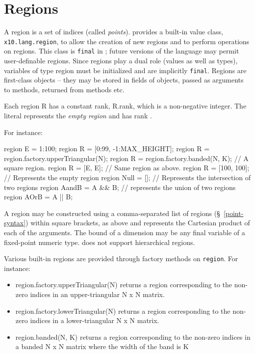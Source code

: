 \section{Regions}\label{XtenRegions}

A region is a set of indices (called {\em points}).  {}\Xten{}
provides a built-in value class, {\tt x10.lang.region}, to allow the
creation of new regions and to perform operations on regions. This
class is {\tt final} in {}\XtenCurrVer; future versions of the
language may permit user-definable regions. Since regions play a dual
role (values as well as types), variables of type {\cf region} must be
initialized and are implicitly {\tt final}. Regions are first-class
objects -- they may be stored in fields of objects, passed as
arguments to methods, returned from methods etc.

Each region {\cf R} has a constant rank, {\cf R.rank}, which is a
non-negative integer. The literal {\cf []} represents the {\em empty
region} and has rank {}.

For instance:
\begin{x10}
region E = 1:100;
region R = [0:99, -1:MAX\_HEIGHT];   
region R = region.factory.upperTriangular(N);
region R = region.factory.banded(N, K);
   // A square region.
region R = [E, E];           
   // Same region as above.
region R = [100, 100];       
   // Represents  the empty region
region Null = [];            
   // Represents the intersection of two regions
region AandB = A \&\& B;       
  // represents the union of two regions
region AOrB = A || B;        
\end{x10}

A region may be constructed using a comma-separated list of regions
(\S~\ref{point-syntax}) within square brackets, as above and represents
the Cartesian product of each of the arguments.  The bound of a
dimension may be any final variable of a fixed-point numeric
type. \XtenCurrVer{} does not support hierarchical regions.

Various built-in regions are provided through  factory
methods on {\tt region}.  For instance:
\begin{itemize}
{}\item {\cf region.factory.upperTriangular(N)} returns a region corresponding
to the non-zero indices in an upper-triangular {\cf N x N} matrix.
{}\item {\cf region.factory.lowerTriangular(N)} returns a region corresponding
to the non-zero indices in a lower-triangular {\cf N x N} matrix.
{}\item {\cf region.banded(N, K)} returns a region corresponding to
the non-zero indices in a banded {\cf N x N} matrix where the width of
the band is {\cf K}
\end{itemize}

